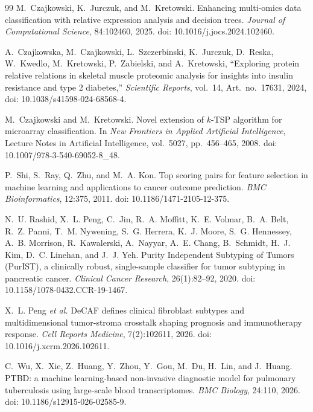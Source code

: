 \documentclass[preprint,12pt,a4paper]{elsarticle}
\begin{document}
\begin{thebibliography}{99}
M.~Czajkowski, K.~Jurczuk, and M.~Kretowski.
\newblock Enhancing multi-omics data classification with relative expression analysis and decision trees.
\newblock \emph{Journal of Computational Science}, 84:102460, 2025.
\newblock doi: 10.1016/j.jocs.2024.102460.

A.~Czajkowska, M.~Czajkowski, L.~Szczerbinski, K.~Jurczuk,
D.~Reska, W.~Kwedlo, M.~Kretowski, P.~Zabielski, and A.~Kretowski,
``Exploring protein relative relations in skeletal muscle proteomic analysis for insights into insulin resistance and type 2 diabetes,''
\emph{Scientific Reports}, vol.~14, Art.~no.~17631, 2024,
doi: 10.1038/s41598-024-68568-4.

M.~Czajkowski and M.~Kretowski.
\newblock Novel extension of $k$-TSP algorithm for microarray classification.
\newblock In \emph{New Frontiers in Applied Artificial Intelligence},
Lecture Notes in Artificial Intelligence, vol.~5027, pp.~456--465, 2008.
\newblock doi: 10.1007/978-3-540-69052-8\_48.

P.~Shi, S.~Ray, Q.~Zhu, and M.~A. Kon.
\newblock Top scoring pairs for feature selection in machine learning and applications to cancer outcome prediction.
\newblock \emph{BMC Bioinformatics}, 12:375, 2011.
\newblock doi: 10.1186/1471-2105-12-375.

N.~U. Rashid, X.~L. Peng, C.~Jin, R.~A. Moffitt, K.~E. Volmar,
B.~A. Belt, R.~Z. Panni, T.~M. Nywening, S.~G. Herrera,
K.~J. Moore, S.~G. Hennessey, A.~B. Morrison, R.~Kawalerski,
A.~Nayyar, A.~E. Chang, B.~Schmidt, H.~J. Kim, D.~C. Linehan,
and J.~J. Yeh.
\newblock Purity Independent Subtyping of Tumors (PurIST), a clinically robust,
single-sample classifier for tumor subtyping in pancreatic cancer.
\newblock \emph{Clinical Cancer Research}, 26(1):82--92, 2020.
\newblock doi: 10.1158/1078-0432.CCR-19-1467.

X.~L. Peng \emph{et al.}
\newblock DeCAF defines clinical fibroblast subtypes and multidimensional
tumor-stroma crosstalk shaping prognosis and immunotherapy response.
\newblock \emph{Cell Reports Medicine}, 7(2):102611, 2026.
\newblock doi: 10.1016/j.xcrm.2026.102611.


C.~Wu, X.~Xie, Z.~Huang, Y.~Zhou, Y.~Gou, M.~Du, H.~Lin, and J.~Huang.
\newblock PTBD: a machine learning-based non-invasive diagnostic model for pulmonary tuberculosis using large-scale blood transcriptomes.
\newblock \emph{BMC Biology}, 24:110, 2026.
\newblock doi: 10.1186/s12915-026-02585-9.


\end{thebibliography}
\end{document}
